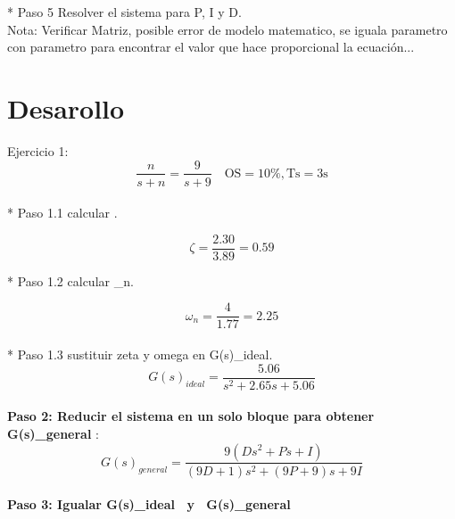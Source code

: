 \documentclass[12pt,letterpaper]{article}
\begin{document}
* Paso 5 Resolver el sistema para P, I y D. \\

Nota: Verificar Matriz, posible error de modelo matematico, se iguala parametro con parametro para encontrar el valor que hace proporcional la ecuación... 

\section{Desarollo}


\setcounter{equation}{0} %

Ejercicio 1: \\ 



\begin{equation}\frac{n}{s+n} = \frac{9}{s+9} \quad \mathrm{OS}=10 \%, \mathrm{Ts}=3 \mathrm{s}\end{equation} \\ 


* Paso 1.1 calcular \zeta.

\begin{equation}\zeta=\frac{2.30}{3.89}=0.59\end{equation} 

* Paso 1.2 calcular \omega_{n}. 

\begin{equation}\omega_{n}=\frac{4}{1.77} = 2.25\end{equation}  \\

* Paso 1.3 sustituir zeta y omega en G(s)_{ideal}. \\ 

\begin{equation}G(s)_{ideal}=\frac{5.06}{s^{2}+2.65s+5.06}\end{equation} \\ 

\textbf{Paso 2: Reducir el sistema en un solo bloque para obtener G(s)_{general} }: \\

\begin{equation}G(s)_{general} =  \frac{9(Ds^{2}+Ps+I)}{(9D+1)s^{2}+(9P+9)s+9I} \end{equation} \\ 

\textbf{Paso 3: Igualar  {G(s)_{ideal} \ y \ G(s)_{general}} } \\ 
\end{document}
